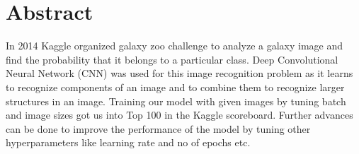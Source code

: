 \section{Abstract}

In 2014 Kaggle organized galaxy zoo challenge to analyze a galaxy image and find the probability that it belongs to a particular class.
Deep Convolutional Neural Network (CNN) was used for this image recognition problem as it learns to recognize components of an image and to combine them to recognize larger structures in an image.
Training our model with given  images by tuning batch and image sizes got us into Top 100 in the  Kaggle scoreboard.
Further advances can be done to improve the performance of the model by tuning other hyperparameters like learning rate and no of epochs etc.